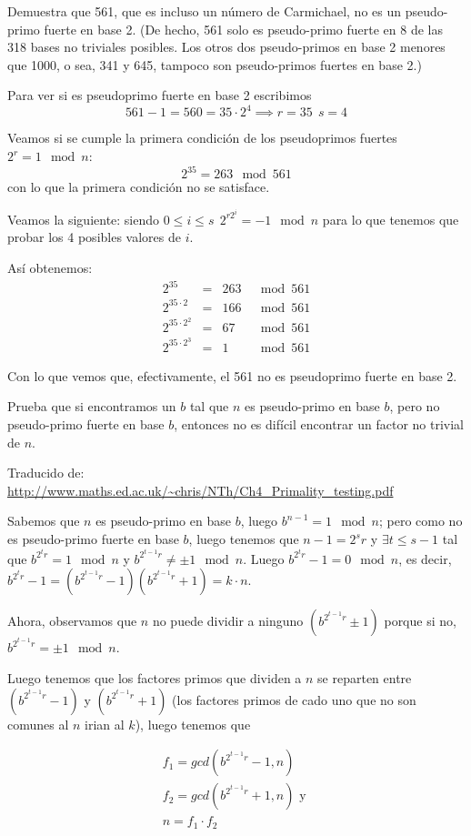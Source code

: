 \begin{problem}[17]
Demuestra que 561, que es incluso un número de Carmichael, no es un
pseudo-primo fuerte en base 2. (De hecho, 561 solo es pseudo-primo
fuerte en 8 de las 318 bases no triviales posibles. Los otros dos
pseudo-primos en base 2 menores que 1000, o sea, 341 y 645,
tampoco son pseudo-primos fuertes en base 2.)
\solution


Para ver si es pseudoprimo fuerte en base 2 escribimos
\[561 - 1 = 560 = 35 \cdot 2^4 \implies r=35 \ \ s=4\]

Veamos si se cumple la primera condición de los pseudoprimos fuertes $2^r = 1 \mod n$:
\[ 2^{35}=263 \mod 561 \]
con lo que la primera condición no se satisface.

Veamos la siguiente: siendo $0 \leq i \leq s \ \ 2^{r2^i}=-1 \mod n$ para lo que tenemos que probar los 4 posibles valores de $i$.

Así obtenemos:
\[\begin{array}{rcrl}
2^{35} & = & 263 & \mod 561 \\
2^{35\cdot 2} & = & 166  & \mod 561\\
2^{35 \cdot 2^2} & = & 67 & \mod 561\\
2^{35\cdot 2^3} & = & 1 & \mod 561
\end{array}\]

Con lo que vemos que, efectivamente, el 561 no es pseudoprimo fuerte en base 2.

\end{problem}

\begin{problem}[18]
Prueba que si encontramos un $b$ tal que $n$ es pseudo-primo en base
$b$, pero no pseudo-primo fuerte en base $b$, entonces no es
difícil encontrar un factor no trivial de $n$.
\solution

Traducido de: \url{http://www.maths.ed.ac.uk/~chris/NTh/Ch4_Primality_testing.pdf}

Sabemos que $n$ es pseudo-primo en base $b$, luego $b^{n-1} = 1 \mod n$; pero como no es pseudo-primo fuerte en base $b$, luego tenemos que $n-1=2^{s}r$ y $\exists t\leq s-1$ tal que $b^{2^{t}r} = 1 \mod n$ y $b^{2^{t-1}r} \neq \pm 1 \mod n$. Luego $b^{2^{t}r} - 1 = 0 \mod n$, es decir, $b^{2^{t}r} - 1 = (b^{2^{t-1}r} - 1) (b^{2^{t-1}r} + 1) = k \cdot n$.

Ahora, observamos que $n$ no puede dividir a ninguno $(b^{2^{t-1}r} \pm 1)$ porque si no, $b^{2^{t-1}r} = \pm 1 \mod n$.

Luego tenemos que los factores primos que dividen a $n$ se reparten entre $(b^{2^{t-1}r} - 1)$ y $(b^{2^{t-1}r} + 1)$ (los factores primos de cado uno que no son comunes al $n$ irian al $k$), luego tenemos que

\begin{gather*}
f_1 = gcd(b^{2^{t-1}r} - 1,n)\\
f_2 = gcd(b^{2^{t-1}r} + 1,n) \text{ y }\\
n = f_1 \cdot f_2
\end{gather*}


\end{problem}

